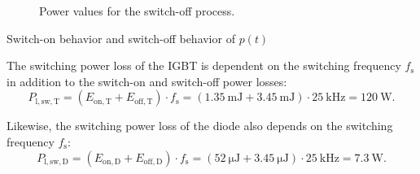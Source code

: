\begin{solutionblock}
\begin{solutionfigure}[ht]
\begin{subfigure}[t]{0.45\textwidth}
        \caption{Power values for the switch-off process.}
        \label{fig:Power values for the switch-off process}
    \end{subfigure}
    \caption{Switch-on behavior and switch-off behavior of $p(t)$}
\end{solutionfigure}
\end{solutionblock}


\begin{solutionblock}
The switching power loss of the IGBT is dependent on the switching frequency $f_{\mathrm{s}}$ in addition to the switch-on and switch-off power losses:
\begin{equation}
    P_{\mathrm{l,sw,T}} =  (E_{\mathrm{on,T}} +  E_{\mathrm{off,T}}) \cdot f_{\mathrm{s}} = (\SI {1.35}{\milli\joule} + \SI {3.45}{\milli\joule}) \cdot \SI {25}{\kilo\hertz} = \SI {120}{\watt}.
 \end{equation}

 Likewise, the switching power loss of the diode also depends on the switching frequency $f_{\mathrm{s}}$:
 \begin{equation}
    P_{\mathrm{l,sw,D}} =  (E_{\mathrm{on,D}} +  E_{\mathrm{off,D}}) \cdot f_{\mathrm{s}} = (\SI {52}{\micro\joule} + \SI {3.45}{\micro\joule}) \cdot \SI {25}{\kilo\hertz} = \SI {7.3}{\watt}.
 \end{equation}
\end{solutionblock}


